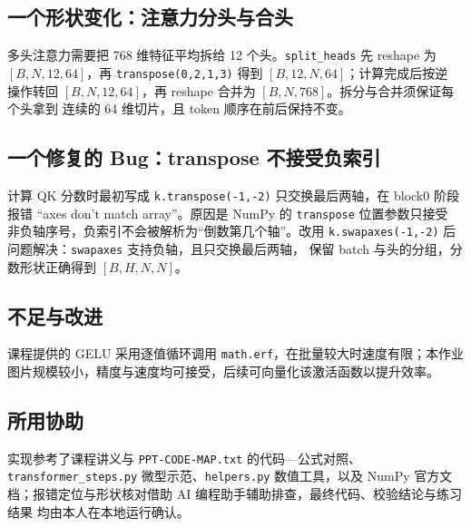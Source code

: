 \documentclass[a4paper,12pt]{article}
\begin{document}
\subsection{一个形状变化：注意力分头与合头}
多头注意力需要把 768 维特征平均拆给 12 个头。\texttt{split\_heads} 先 reshape 为
$[B,N,12,64]$，再 \texttt{transpose(0,2,1,3)} 得到 $[B,12,N,64]$；计算完成后按逆
操作转回 $[B,N,12,64]$，再 reshape 合并为 $[B,N,768]$。拆分与合并须保证每个头拿到
连续的 64 维切片，且 token 顺序在前后保持不变。

\subsection{一个修复的 Bug：transpose 不接受负索引}
计算 QK 分数时最初写成 \texttt{k.transpose(-1,-2)} 只交换最后两轴，在 block0 阶段
报错 “axes don't match array”。原因是 NumPy 的 \texttt{transpose} 位置参数只接受
非负轴序号，负索引不会被解析为“倒数第几个轴”。改用
\texttt{k.swapaxes(-1,-2)} 后问题解决：\texttt{swapaxes} 支持负轴，且只交换最后两轴，
保留 batch 与头的分组，分数形状正确得到 $[B,H,N,N]$。

\subsection{不足与改进}
课程提供的 GELU 采用逐值循环调用 \texttt{math.erf}，在批量较大时速度有限；本作业
图片规模较小，精度与速度均可接受，后续可向量化该激活函数以提升效率。

\subsection{所用协助}
实现参考了课程讲义与 \texttt{PPT-CODE-MAP.txt} 的代码—公式对照、
\texttt{transformer\_steps.py} 微型示范、\texttt{helpers.py} 数值工具，以及 NumPy
官方文档；报错定位与形状核对借助 AI 编程助手辅助排查，最终代码、校验结论与练习结果
均由本人在本地运行确认。

\newpage



\vspace{1cm}
\end{document}
